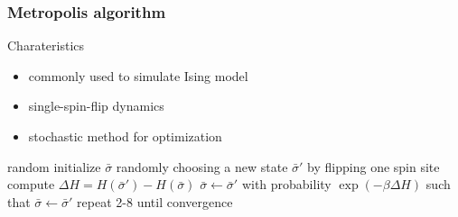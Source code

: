 \documentclass[notheorems]{beamer}
\begin{document}
\begin{frame}
\frametitle{Metropolis algorithm}
\begin{block}{Charateristics}
\begin{itemize}
	\item commonly used to simulate Ising model
	\item single-spin-flip dynamics 
	\item stochastic method for optimization
\end{itemize}
\end{block}
	\begin{algorithmic}[1]
	\STATE random initialize $\bar{\sigma}$
	\STATE randomly choosing a new state $\bar{\sigma}'$ by flipping one spin site
	\STATE compute $\Delta H= H(\bar{\sigma}') - H(\bar{\sigma})$
	\STATE $\bar{\sigma} \leftarrow \bar{\sigma}'$
	\ELSE
	\STATE with probability $\exp(-\beta \Delta H)$ 
	such that $\bar{\sigma} \leftarrow \bar{\sigma}'$ 
	\ENDIF
	\STATE repeat 2-8 until convergence
\end{algorithmic}
\end{frame}
\end{document}
